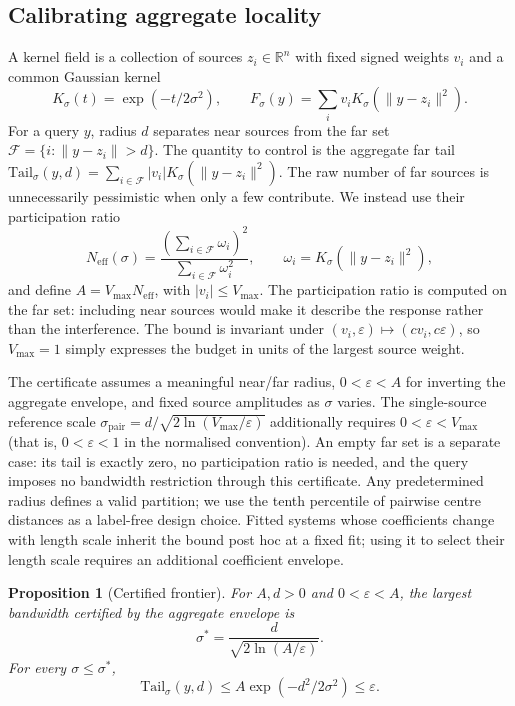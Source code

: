 \documentclass[10pt,twocolumn]{article}
\newtheorem{proposition}{Proposition}
\newcommand{\Ksig}{K_{\sigma}}
\newcommand{\sstar}{\sigma^{*}}
\newcommand{\Neff}{N_{\mathrm{eff}}}
\newcommand{\Tail}{\mathrm{Tail}}
\newcommand{\Rbb}{\mathbb{R}}
\begin{document}
\subsection{Calibrating aggregate locality}\label{sec:cert}

A kernel field is a collection of sources $z_i\in\Rbb^n$ with fixed signed weights $v_i$ and a common Gaussian kernel
\begin{equation}
\Ksig(t)=\exp(-t/2\sigma^2),\qquad F_{\sigma}(y)=\sum_i v_i\Ksig(\lVert y-z_i\rVert^2).
\end{equation}
For a query $y$, radius $d$ separates near sources from the far set $\mathcal{F}=\{i:\lVert y-z_i\rVert>d\}$. The quantity to control is the aggregate far tail
$\Tail_{\sigma}(y,d)=\sum_{i\in\mathcal{F}}|v_i|\Ksig(\lVert y-z_i\rVert^2)$.
The raw number of far sources is unnecessarily pessimistic when only a few contribute. We instead use their participation ratio
\begin{equation}
\Neff(\sigma)=\frac{(\sum_{i\in\mathcal{F}}\omega_i)^2}{\sum_{i\in\mathcal{F}}\omega_i^2},\qquad
\omega_i=\Ksig(\lVert y-z_i\rVert^2),
\end{equation}
and define $A=V_{\max}\Neff$, with $|v_i|\le V_{\max}$. The participation ratio is computed on the far set: including near sources would make it describe the response rather than the interference. The bound is invariant under $(v_i,\varepsilon)\mapsto(cv_i,c\varepsilon)$, so $V_{\max}=1$ simply expresses the budget in units of the largest source weight.

The certificate assumes a meaningful near/far radius, $0<\varepsilon<A$ for inverting the aggregate envelope, and fixed source amplitudes as $\sigma$ varies. The single-source reference scale $\sigma_{\mathrm{pair}}=d/\sqrt{2\ln(V_{\max}/\varepsilon)}$ additionally requires $0<\varepsilon<V_{\max}$ (that is, $0<\varepsilon<1$ in the normalised convention). An empty far set is a separate case: its tail is exactly zero, no participation ratio is needed, and the query imposes no bandwidth restriction through this certificate. Any predetermined radius defines a valid partition; we use the tenth percentile of pairwise centre distances as a label-free design choice. Fitted systems whose coefficients change with length scale inherit the bound post hoc at a fixed fit; using it to select their length scale requires an additional coefficient envelope.

\begin{proposition}[Certified frontier]\label{prop:frontier}
For $A,d>0$ and $0<\varepsilon<A$, the largest bandwidth certified by the aggregate envelope is
\begin{equation}\label{eq:sstar}
\sstar=\frac{d}{\sqrt{2\ln(A/\varepsilon)}}.
\end{equation}
For every $\sigma\le\sstar$,
\begin{equation}\label{eq:aggbound}
\Tail_{\sigma}(y,d)\le A\exp(-d^2/2\sigma^2)\le\varepsilon.
\end{equation}
\end{proposition}
\end{document}
